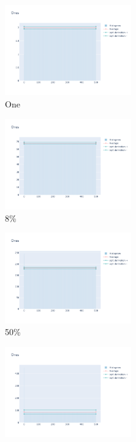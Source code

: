 \documentclass[12pt, fleqn]{report}                             %
\theoremstyle{break}                                            %
\begin{document}
      \begin{figure}[ht!]
        \centering
        \begin{subfigure}[b]{0.4\linewidth}
          \includegraphics[width=0.6\textwidth]{Images/46/dia-a.png}
          \caption{One}
        \end{subfigure}
        \begin{subfigure}[b]{0.4\linewidth}
          \includegraphics[width=0.6\textwidth]{Images/46/dia-b.png}
          \caption{8\%}
        \end{subfigure}
        \begin{subfigure}[b]{0.4\linewidth}
          \includegraphics[width=0.6\textwidth]{Images/46/dia-c.png}
          \caption{50\%}
        \end{subfigure}
        \begin{subfigure}[b]{0.4\linewidth}
          \includegraphics[width=0.6\textwidth]{Images/46/dia-d.png}

\end{subfigure}
\end{figure}
\end{document}
